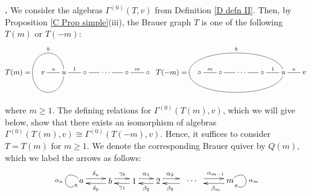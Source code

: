 \documentclass[12pt]{amsart}
\def \para{\refstepcounter{thm} \par\medskip\noindent
                \textbf{\thethm .} }
\numberwithin{equation}{thm}
\newcounter{ni}
\begin{document}
\para
We consider the algebras $\Gamma^{(0)}(T,v)$ from Definition \ref{D defn II}. Then, by Proposition \ref{C Prop simple}(iii), 
the Brauer graph $T$ is one of the following $T(m)$ or $T(-m)$:
\[
\label{D II Brauer graph}
T(m)=\begin{xy}
(0,0)*[o]+{v}="3", (10,0)*[o]+{u}="v",(20,0)*[o]+{\circ}="4", (30,0)*[o]+{\cdots}="d3",(40,0)*[o]+{\circ}="6",
(-5,0)*{}="dammy",(50,0)*[o]+{\circ}="7"
\ar @{-}"3";"v"^{a}
\ar @{-}"v";"4"^{1}
\ar @{-}"4";"d3"
\ar @{-}"d3";"6"
\ar @{-}"6";"7"^{m}
\ar @{-} @(u,u)"v";"dammy"_{b}
\ar @{-} @(d,d)"dammy";"v"
\end{xy} \;\; T(-m)=\begin{xy}
(0,0)*[o]+{\circ}="0",(10,0)*[o]+{\circ}="1",(20,0)*[o]+{\cdots}="d1",(30,0)*[o]+{\circ}="3",
(40,0)*[o]+{u}="v",(50,0)*[o]+{v}="4",
(-5,0)*{}="dammy",
\ar @{-}"0";"1"^{m}
\ar @{-}"1";"d1"
\ar @{-}"d1";"3"
\ar @{-}"3";"v"^{1}
\ar @{-}"v";"4"^{a}
\ar @{-} @(u,u)"v";"dammy"_{b}
\ar @{-} @(d,d)"dammy";"v"
\end{xy}
\]
where $m\ge 1$. The defining relations for $\Gamma^{(0)}(T(m),v)$, which we will give below, show that  
there exists an isomorphism of algebras $\Gamma^{(0)}(T(m),v)\cong \Gamma^{(0)}(T(-m),v)$. 
Hence, it suffices to consider $T=T(m)$ for $m\ge 1$. We denote the corresponding Brauer quiver by $Q(m)$, which we label 
the arrows as follows:
\[
\begin{xy}
(-12,0)*[o]+{a}="-1",
(0,0)*[o]+{b}="0",(10,0)*[o]+{1}="1",(20,0)*[o]+{2}="2", (30,0)*[o]+{}="3",(34,0)*{\cdots}="d1",(38,0)*[o]+{}="m-1",
(50,0)*[o]+{m}="m"
\ar @<1mm> "-1";"0"^{\delta_a}
\ar @<1mm> "0";"-1"^{\delta_b}
\ar @<1mm> "0";"1"^{\gamma_b}
\ar @<1mm> "1";"0"^{\gamma_{1}}
\ar @<1mm> "1";"2"^{\alpha_{1}}
\ar @<1mm> "2";"1"^{\beta_{2}}
\ar @<1mm> "2";"3"^{\alpha_{2}}
\ar @<1mm> "3";"2"^{\beta_{3}}
\ar @<1mm> "m-1";"m"^{\alpha_{m-1}}
\ar @<1mm> "m";"m-1"^{\beta_{m}}
\SelectTips{eu}{}
\ar @(ul,dl)"-1";"-1"_{\alpha_a}
\ar @(ur,dr)"m";"m"^{\alpha_m}
\end{xy}
\]
\end{document}
